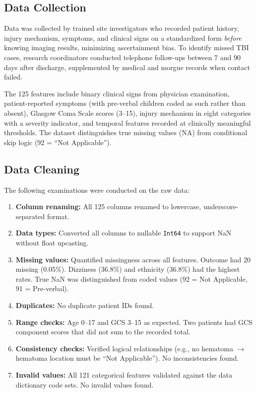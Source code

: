\documentclass[11pt,letterpaper]{article}
\begin{document}
\subsection{Data Collection}\label{data-collection}
Data was collected by trained site investigators who recorded patient history, injury mechanism, symptoms, and clinical signs on a standardized form \textit{before} knowing imaging results, minimizing ascertainment bias. To identify missed TBI cases, research coordinators conducted telephone follow-ups between 7 and 90 days after discharge, supplemented by medical and morgue records when contact failed.

The 125 features include binary clinical signs from physician examination, patient-reported symptoms (with pre-verbal children coded as such rather than absent), Glasgow Coma Scale scores (3--15), injury mechanism in eight categories with a severity indicator, and temporal features recorded at clinically meaningful thresholds. The dataset distinguishes true missing values (NA) from conditional skip logic (92 = ``Not Applicable'').



\subsection{Data Cleaning}\label{data-cleaning}

The following examinations were conducted on the raw data:

\begin{enumerate}
    \item \textbf{Column renaming:} All 125 columns renamed to lowercase, underscore-separated format.
    \item \textbf{Data types:} Converted all columns to nullable \texttt{Int64} to support NaN without float upcasting.
    \item \textbf{Missing values:} Quantified missingness across all features. Outcome had 20 missing (0.05\%). Dizziness (36.8\%) and ethnicity (36.8\%) had the highest rates. True NaN was distinguished from coded values (92 = Not Applicable, 91 = Pre-verbal).
    \item \textbf{Duplicates:} No duplicate patient IDs found.
    \item \textbf{Range checks:} Age 0--17 and GCS 3--15 as expected. Two patients had GCS component scores that did not sum to the recorded total.
    \item \textbf{Consistency checks:} Verified logical relationships (e.g., no hematoma $\rightarrow$ hematoma location must be ``Not Applicable''). No inconsistencies found.
    \item \textbf{Invalid values:} All 121 categorical features validated against the data dictionary code sets. No invalid values found.
\end{enumerate}
\end{document}
